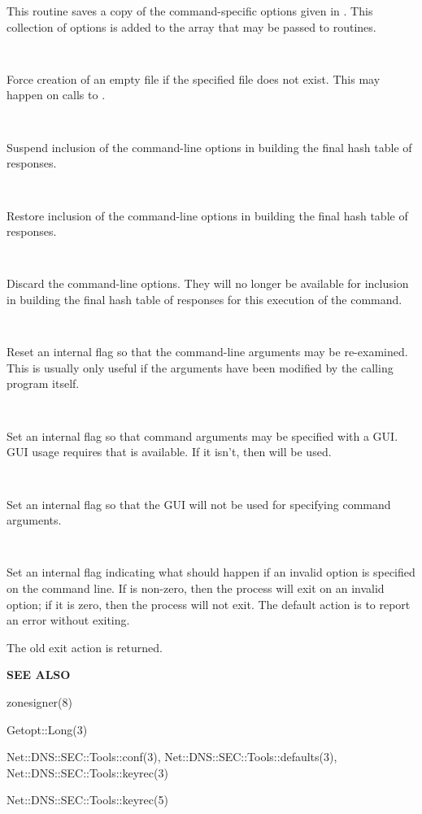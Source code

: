 \begin{description}
This routine saves a copy of the command-specific options given in
\var{\@csopts}.  This collection of options is added to the \var{\@csopts}
array that may be passed to  routines.

\item {}\verb" "

Force creation of an empty  file if the specified file does not
exist.  This may happen on calls to .

\item {}\verb" "

Suspend inclusion of the command-line options in building the final hash table
of responses.

\item {}\verb" "

Restore inclusion of the command-line options in building the final hash
table of responses.

\item {}\verb" "

Discard the command-line options.  They will no longer be available for
inclusion in building the final hash table of responses for this execution
of the command.

\item {}\verb" "

Reset an internal flag so that the command-line arguments may be
re-examined.  This is usually only useful if the arguments have been
modified by the calling program itself.

\item {}\verb" "

Set an internal flag so that command arguments may be specified with a GUI.
GUI usage requires that  is available.  If it
isn't, then  will be used.

\item {}\verb" "

Set an internal flag so that the GUI will not be used for specifying
command arguments.

\item {}\verb" "

Set an internal flag indicating what should happen if an invalid option is
specified on the command line.  If  is non-zero, then the process
will exit on an invalid option; if it is zero, then the process will not
exit.  The default action is to report an error without exiting.

The old exit action is returned.

\end{description}

{\bf SEE ALSO}

zonesigner(8)

Getopt::Long(3)

Net::DNS::SEC::Tools::conf(3),
Net::DNS::SEC::Tools::defaults(3), \\
Net::DNS::SEC::Tools::keyrec(3)

Net::DNS::SEC::Tools::keyrec(5)

